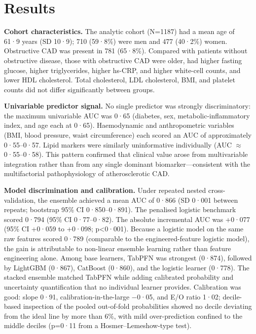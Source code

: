 \documentclass[english,11pt]{article}
\begin{document}
\section*{Results}

\textbf{Cohort characteristics.}
The analytic cohort (N=1187) had a mean age of 61·9 years (SD 10·9); 710 (59·8\%) were men and 477 (40·2\%) women. Obstructive CAD was present in 781 (65·8\%). Compared with patients without obstructive disease, those with obstructive CAD were older, had higher fasting glucose, higher triglycerides, higher hs-CRP, and higher white-cell counts, and lower HDL cholesterol. Total cholesterol, LDL cholesterol, BMI, and platelet counts did not differ significantly between groups.

\textbf{Univariable predictor signal.}
No single predictor was strongly discriminatory: the maximum univariable AUC was 0·65 (diabetes, sex, metabolic-inflammatory index, and age each at 0·65). Haemodynamic and anthropometric variables (BMI, blood pressure, waist circumference) each scored an AUC of approximately 0·55--0·57. Lipid markers were similarly uninformative individually (AUC $\approx$0·55--0·58). This pattern confirmed that clinical value arose from multivariable integration rather than from any single dominant biomarker---consistent with the multifactorial pathophysiology of atherosclerotic CAD.

\textbf{Model discrimination and calibration.}
Under repeated nested cross-validation, the ensemble achieved a mean AUC of 0·866 (SD 0·001 between repeats; bootstrap 95\% CI 0·850--0·891). The penalised logistic benchmark scored 0·794 (95\% CI 0·77--0·82). The absolute incremental AUC was +0·077 (95\% CI +0·059 to +0·098; p\textless0·001). Because a logistic model on the same raw features scored 0·789 (comparable to the engineered-feature logistic model), the gain is attributable to non-linear ensemble learning rather than feature engineering alone. Among base learners, TabPFN was strongest (0·874), followed by LightGBM (0·867), CatBoost (0·860), and the logistic learner (0·778). The stacked ensemble matched TabPFN while adding calibrated probability and uncertainty quantification that no individual learner provides. Calibration was good: slope 0·91, calibration-in-the-large $-$0·05, and E/O ratio 1·02; decile-based inspection of the pooled out-of-fold probabilities showed no decile deviating from the ideal line by more than 6\%, with mild over-prediction confined to the middle deciles (p=0·11 from a Hosmer--Lemeshow-type test).
\end{document}
